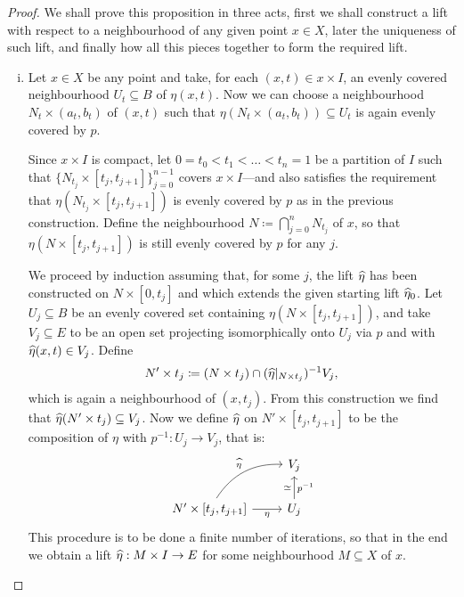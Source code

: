 \begin{proof}
We shall prove this proposition in three acts, first we shall construct a lift
with respect to a neighbourhood of any given point \(x \in X\), later the
uniqueness of such lift, and finally how all this pieces together to form the
required lift.

\begin{enumerate}[(i)]\setlength\itemsep{0em}
\item Let \(x \in X\) be any point and take, for each \((x, t) \in x \times I\),
  an evenly covered neighbourhood \(U_t \subseteq B\) of \(\eta(x, t)\). Now we
  can choose a neighbourhood \(N_t \times (a_t, b_t)\) of \((x, t)\) such that
  \(\eta(N_t \times (a_t, b_t)) \subseteq U_t\) is again evenly covered by
  \(p\).

  Since \(x \times I\) is compact, let \(0 = t_0 < t_1 < \dots < t_n = 1\) be a
  partition of \(I\) such that \(\{N_{t_j} \times [t_j, t_{j+1}]\}_{j=0}^{n-1}\)
  covers \(x \times I\)---and also satisfies the requirement that
  \(\eta(N_{t_j} \times [t_j, t_{j+1}])\) is evenly covered by \(p\) as in the
  previous construction. Define the neighbourhood
  \(N \coloneq \bigcap_{j=0}^n N_{t_j}\) of \(x\), so that
  \(\eta(N \times [t_j, t_{j+1}])\) is still evenly covered by \(p\) for any \(j\).

  We proceed by induction assuming that, for some \(j\), the lift \(\widehat \eta\)
  has been constructed on \(N \times [0, t_j]\) and which extends the given
  starting lift \(\widehat \eta_0\). Let \(U_j \subseteq B\) be an evenly covered
  set containing \(\eta(N \times [t_j, t_{j+1}])\), and take
  \(V_j \subseteq E\) to be an open set projecting isomorphically onto \(U_j\)
  via \(p\) and with \(\widehat\eta(x, t) \in V_j\).  Define
  \[
  N' \times t_j \coloneq (N \times t_j) \cap (\widehat\eta|_{N \times t_j})^{-1} V_j,
  \]
  which is again a neighbourhood of \((x, t_j)\). From this construction we find
  that \(\widehat\eta(N' \times t_j) \subseteq V_j\). Now we define \(\widehat\eta\)
  on \(N' \times [t_j, t_{j+1}]\) to be the composition of \(\eta\) with
  \(p^{-1}: U_j \to V_j\), that is:
  \[
  \begin{tikzcd}
  &V_j \\
  N' \times [t_j, t_{j+1}]
  \ar[ru, bend left, "\lift\eta"]
  \ar[r, "\eta"']
  & U_j \ar[u, "p^{-1}"', "\dis"]
  \end{tikzcd}
  \]
  This procedure is to be done a finite number of iterations, so that in the end
  we obtain a lift \(\widehat\eta: M \times I \to E\) for some neighbourhood
  \(M \subseteq X\) of \(x\).


\end{enumerate}
\end{proof}
